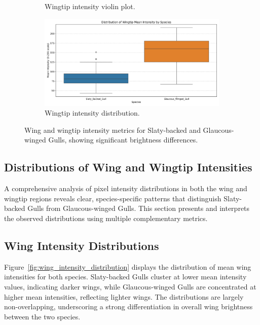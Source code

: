 \documentclass[a4paper,12pt]{report}
\begin{document}
\begin{figure}[H]
\begin{subfigure}[b]{0.48\textwidth}
        \caption{Wingtip intensity violin plot.}
        \label{fig:wingtip_intensity_violin}
    \end{subfigure}
    \hfill
    \begin{subfigure}[b]{0.48\textwidth}
        \centering
        \includegraphics[width=\textwidth]{images/REPORT_IMAGES_INTENSITY/I2/wingtip_intensity_distribution.png}
        \caption{Wingtip intensity distribution.}
        \label{fig:wingtip_intensity_distribution}
    \end{subfigure}
    \caption{Wing and wingtip intensity metrics for Slaty-backed and Glaucous-winged Gulls, showing significant brightness differences.}
    \label{fig:intensity_combined}
\end{figure}

\subsection{Distributions of Wing and Wingtip Intensities}

A comprehensive analysis of pixel intensity distributions in both the wing and wingtip regions reveals clear, species-specific patterns that distinguish Slaty-backed Gulls from Glaucous-winged Gulls. This section presents and interprets the observed distributions using multiple complementary metrics.

\subsection{Wing Intensity Distributions}

Figure~\ref{fig:wing_intensity_distribution} displays the distribution of mean wing intensities for both species. Slaty-backed Gulls cluster at lower mean intensity values, indicating darker wings, while Glaucous-winged Gulls are concentrated at higher mean intensities, reflecting lighter wings. The distributions are largely non-overlapping, underscoring a strong differentiation in overall wing brightness between the two species.
\end{document}
